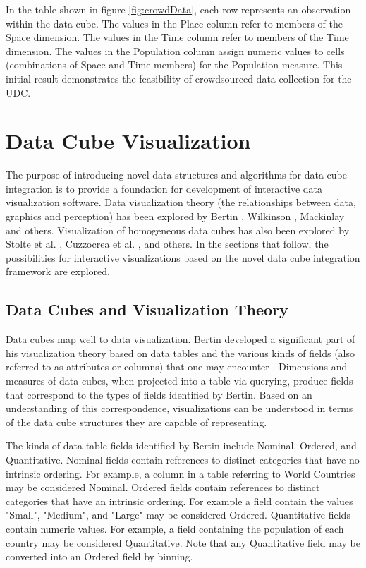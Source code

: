 \documentclass[12pt]{article}
\begin{document}
\begin{doublespace}
In the table shown in figure \ref{fig:crowdData}, each row represents an observation within the data cube. The values in the Place column refer to members of the Space dimension. The values in the Time column refer to members of the Time dimension. The values in the Population column assign numeric values to cells (combinations of Space and Time members) for the Population measure. This initial result demonstrates the feasibility of crowdsourced data collection for the UDC.
\pagebreak
\section{Data Cube Visualization}
The purpose of introducing novel data structures and algorithms for data cube integration is to provide a foundation for development of interactive data visualization software. Data visualization theory (the relationships between data, graphics and perception) has been explored by Bertin \cite{bertin1983semiology}, Wilkinson \cite{wilkinson2005grammar}, Mackinlay \cite{mackinlay1986automating} and others. Visualization of homogeneous data cubes has also been explored by Stolte et al. \cite{stolte2003multiscale}, Cuzzocrea et al. \cite{cuzzocrea2009olap}, and others. In the sections that follow, the possibilities for interactive visualizations based on the novel data cube integration framework are explored.
\subsection{Data Cubes and Visualization Theory}
Data cubes map well to data visualization. Bertin developed a significant part of his visualization theory based on data tables and the various kinds of fields (also referred to as attributes or columns) that one may encounter \cite{bertin1983semiology}. Dimensions and measures of data cubes, when projected into a table via querying, produce fields that correspond to the types of fields identified by Bertin. Based on an understanding of this correspondence, visualizations can be understood in terms of the data cube structures they are capable of representing.

The kinds of data table fields identified by Bertin include Nominal, Ordered, and Quantitative. Nominal fields contain references to distinct categories that have no intrinsic ordering. For example, a column in a table referring to World Countries may be considered Nominal. Ordered fields contain references to distinct categories that have an intrinsic ordering. For example a field contain the values "Small", "Medium", and "Large" may be considered Ordered. Quantitative fields contain numeric values. For example, a field containing the population of each country may be considered Quantitative. Note that any Quantitative field may be converted into an Ordered field by binning.


\end{doublespace}
\end{document}
